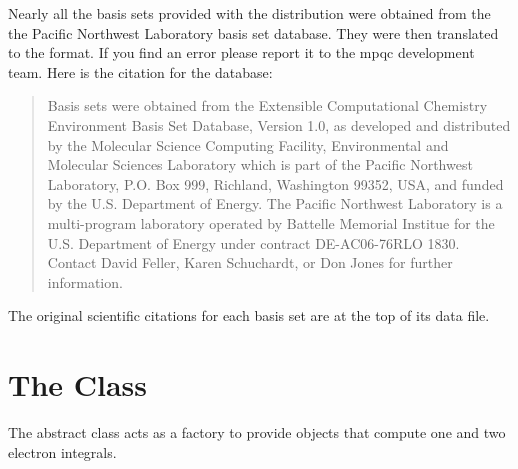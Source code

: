 Nearly all the basis sets provided with the distribution were obtained from
the the Pacific Northwest Laboratory basis set database.  They were then
translated to the  format.  If you find an error
please report it to the mpqc development team.  Here is the citation for
the database:
\begin{quote}
Basis sets were obtained from the Extensible Computational Chemistry
Environment Basis Set Database, Version 1.0, as developed and
distributed by the Molecular Science Computing Facility, Environmental
and Molecular Sciences Laboratory which is part of the Pacific
Northwest Laboratory, P.O. Box 999, Richland, Washington 99352, USA,
and funded by the U.S. Department of Energy. The Pacific Northwest
Laboratory is a multi-program laboratory operated by Battelle Memorial
Institue for the U.S. Department of Energy under contract
DE-AC06-76RLO 1830. Contact David Feller, Karen Schuchardt, or Don
Jones for further information.
\end{quote}
The original scientific citations for each basis set are at the top of its
data file.


\section{The  Class}
\label{Integral}

The  abstract class acts as a factory to provide
objects that compute one and two electron integrals.
